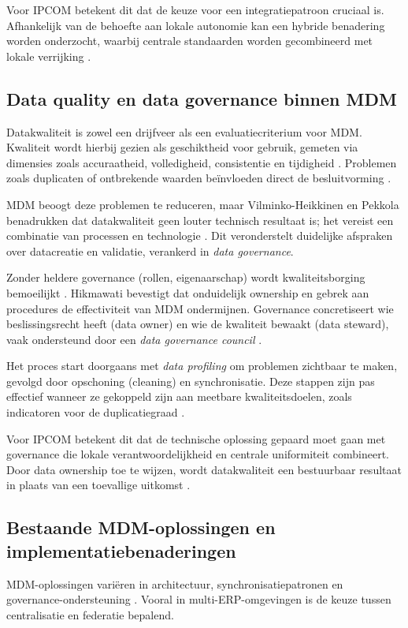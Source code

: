 Voor IPCOM betekent dit dat de keuze voor een integratiepatroon cruciaal is. Afhankelijk van de behoefte aan lokale autonomie kan een hybride benadering worden onderzocht, waarbij centrale standaarden worden gecombineerd met lokale verrijking \autocite{Maedche2010}.

\subsection{Data quality en data governance binnen MDM}
Datakwaliteit is zowel een drijfveer als een evaluatiecriterium voor MDM. Kwaliteit wordt hierbij gezien als geschiktheid voor gebruik, gemeten via dimensies zoals accuraatheid, volledigheid, consistentie en tijdigheid \autocite{Hikmawati}. Problemen zoals duplicaten of ontbrekende waarden beïnvloeden direct de besluitvorming \autocite{Hikmawati}.

MDM beoogt deze problemen te reduceren, maar Vilminko-Heikkinen en Pekkola benadrukken dat datakwaliteit geen louter technisch resultaat is; het vereist een combinatie van processen en technologie \autocite{VilminkoHeikkinenPekkola2019}. Dit veronderstelt duidelijke afspraken over datacreatie en validatie, verankerd in \emph{data governance}.

Zonder heldere governance (rollen, eigenaarschap) wordt kwaliteitsborging bemoeilijkt \autocite{VilminkoHeikkinenPekkola2019}. Hikmawati bevestigt dat onduidelijk ownership en gebrek aan procedures de effectiviteit van MDM ondermijnen. Governance concretiseert wie beslissingsrecht heeft (data owner) en wie de kwaliteit bewaakt (data steward), vaak ondersteund door een \emph{data governance council} \autocite{Hikmawati}.

Het proces start doorgaans met \emph{data profiling} om problemen zichtbaar te maken, gevolgd door opschoning (cleaning) en synchronisatie. Deze stappen zijn pas effectief wanneer ze gekoppeld zijn aan meetbare kwaliteitsdoelen, zoals indicatoren voor de duplicatiegraad \autocite{Hikmawati}.

Voor IPCOM betekent dit dat de technische oplossing gepaard moet gaan met governance die lokale verantwoordelijkheid en centrale uniformiteit combineert. Door data ownership toe te wijzen, wordt datakwaliteit een bestuurbaar resultaat in plaats van een toevallige uitkomst \autocite{VilminkoHeikkinenPekkola2019}.

\subsection{Bestaande MDM-oplossingen en implementatiebenaderingen}
MDM-oplossingen variëren in architectuur, synchronisatiepatronen en governance-ondersteuning \autocite{Rengasamy2025}. Vooral in multi-ERP-omgevingen is de keuze tussen centralisatie en federatie bepalend.



